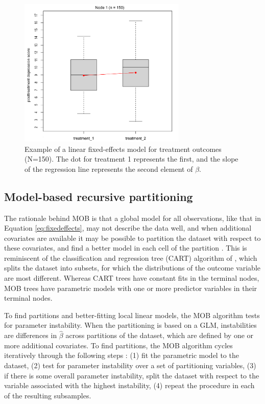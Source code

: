 \documentclass[nobf,doc]{apa}
\begin{document}
\begin{figure}[!htbp]
    \includegraphics[width=8cm]{Interaction_ex;treedepth1.pdf}
	\caption{Example of a linear fixed-effects model for treatment outcomes (N=150). The dot for treatment 1 represents the first, and the slope of the regression line represents the second element of $\beta$.}
	\label{fig:fixedeffects}
\end{figure}



\subsection{Model-based recursive partitioning}

The rationale behind MOB is that a global model for all observations, like that in Equation \ref{eq:fixedeffects}, may not describe the data well, and when additional covariates are available it may be possible to partition the dataset with respect to these covariates, and find a better model in each cell of the partition \cite{ZeilyHoth08}. This is reminiscent of the classification and regression tree (CART) algorithm of , which splits the dataset into subsets, for which the distributions of the outcome variable are most different. Whereas CART trees have constant fits in the terminal nodes, MOB trees have parametric models with one or more predictor variables in their terminal nodes.

To find partitions and better-fitting local linear models, the MOB algorithm tests for parameter instability. When the partitioning is based on a GLM, instabilities are differences in $\hat{\beta}$ across partitions of the dataset, which are defined by one or more additional covariates. To find partitions, the MOB algorithm cycles iteratively through the following steps \cite{ZeilyHoth08}: (1) fit the parametric model to the dataset, (2) test for parameter instability over a set of partitioning variables, (3) if there is some overall parameter instability, split the dataset with respect to the variable associated with the highest instability, (4) repeat the procedure in each of the resulting subsamples.
\end{document}
